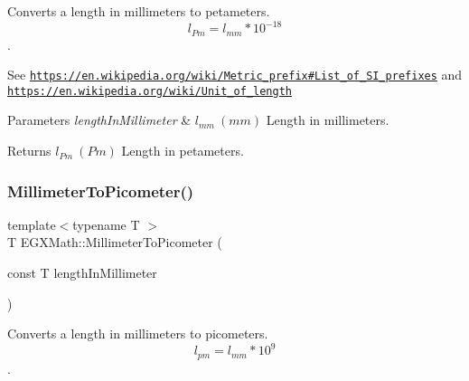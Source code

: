Converts a length in millimeters to petameters. \[ l_{Pm}=l_{mm} * 10^{-18} \]. 

See \href{https://en.wikipedia.org/wiki/Metric_prefix#List_of_SI_prefixes}{\tt https\+://en.\+wikipedia.\+org/wiki/\+Metric\+\_\+prefix\#\+List\+\_\+of\+\_\+\+S\+I\+\_\+prefixes} and \href{https://en.wikipedia.org/wiki/Unit_of_length}{\tt https\+://en.\+wikipedia.\+org/wiki/\+Unit\+\_\+of\+\_\+length} 
\begin{DoxyParams}{Parameters}
{\em length\+In\+Millimeter} & $ l_{mm}\ (mm)$ Length in millimeters. \\
\hline
\end{DoxyParams}
\begin{DoxyReturn}{Returns}
$ l_{Pm}\ (Pm)$ Length in petameters. 
\end{DoxyReturn}
\mbox{\label{group___e_g_x_math-_conversions-_length_conversions-_millimeter-_s_i_ga679e3714c229f1355a5c9bf707fcd723}} 
\subsubsection{\texorpdfstring{Millimeter\+To\+Picometer()}{MillimeterToPicometer()}}
{\footnotesize\ttfamily template$<$typename T $>$ \\
T E\+G\+X\+Math\+::\+Millimeter\+To\+Picometer (\begin{DoxyParamCaption}\item[{const T}]{length\+In\+Millimeter }\end{DoxyParamCaption})}



Converts a length in millimeters to picometers. \[ l_{pm}=l_{mm} * 10^{9} \]. 

